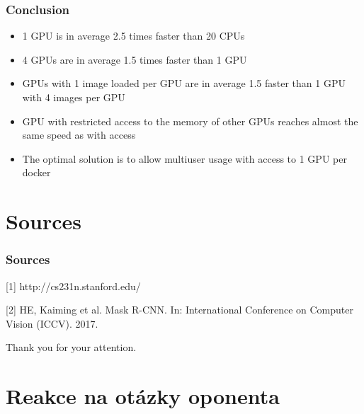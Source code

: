 \documentclass{beamer}
\begin{document}
\begin{frame}

\frametitle{Conclusion}

\begin{itemize}
\item 1 GPU is in average 2.5 times faster than 20 CPUs
\item<2-> 4 GPUs are in average 1.5 times faster than 1 GPU
\item<3-> GPUs with 1 image loaded per GPU are in average 1.5 faster than 1 GPU with 4 images per GPU
\item<4-> GPU with restricted access to the memory of other GPUs reaches almost the same speed as with access
\item<5-> The optimal solution is to allow multiuser usage with access to 1 GPU per docker
\end{itemize}

\end{frame}


\section{Sources}

\begin{frame}

\frametitle{Sources}

[1] http://cs231n.stanford.edu/

[2] HE, Kaiming et al. Mask R-CNN. In: International Conference on Computer
Vision (ICCV). 2017.

\end{frame}


\begin{frame}

\centerline{Thank you for your attention.}

\end{frame}

\iffalse
\section{Reakce na otázky oponenta}
\end{document}
